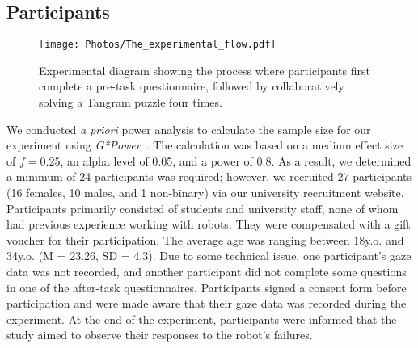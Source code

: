 \subsection{Participants}

\begin{figure*}[t!]
  \centering
  \texttt{[image: Photos/The\_experimental\_flow.pdf]} 
  \caption{Experimental diagram showing the process where participants first complete a pre-task questionnaire, followed by collaboratively solving a Tangram puzzle four times.}
  \label{fig:Experimentdiagram}
\end{figure*}


We conducted \textit{a priori} power analysis to calculate the sample size for our experiment using \textit{G*Power}~\cite{faul_gpower_2007}. The calculation was based on a medium effect size of $f=0.25$, an alpha level of 0.05, and a power of 0.8. As a result, we determined a minimum of 24 participants was required; however, we recruited 27 participants (16 females, 10 males, and 1 non-binary) via our university recruitment website. Participants primarily consisted of students and university staff, none of whom had previous experience working with robots. They were compensated with a gift voucher for their participation. The average age was ranging between 18y.o. and 34y.o.  (M = 23.26, SD = 4.3). Due to some technical issue, one participant's gaze data was not recorded, and another participant did not complete some questions in one of the after-task questionnaires. Participants signed a consent form before participation and were made aware that their gaze data was recorded during the experiment. At the end of the experiment, participants were informed that the study aimed to observe their responses to the robot's failures.